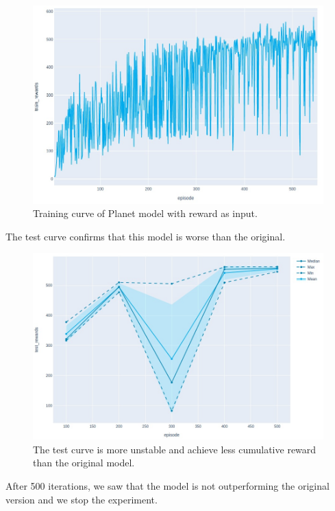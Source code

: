 \begin{figure}[H]
\centering
\includegraphics[width=1. \textwidth, height=.4\textheight]{pictures/planet_train_rew_as_state}
\caption{ Training curve of Planet model with reward as input.}
\end{figure}
The test curve confirms that this model is worse than the original. 

\begin{figure}[H]
\centering
\includegraphics[width=1. \textwidth, height=.35\textheight]{pictures/planet_test_rew_as_state}
\caption{ The test curve is more unstable and achieve less cumulative reward than the original model. }
\end{figure}

After 500 iterations, we saw that the model is not outperforming the original version and we stop the experiment.

